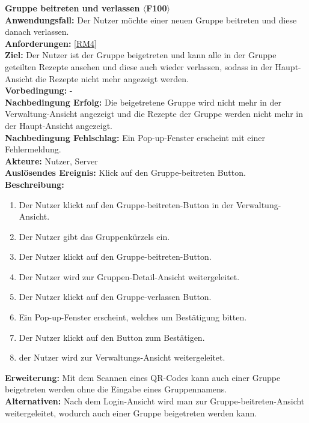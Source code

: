 \documentclass[parskip=full]{scrartcl}
\begin{document}
\textbf{Gruppe beitreten und verlassen $\langle$F100$\rangle$}\\
\textbf{Anwendungsfall:} Der Nutzer möchte einer neuen Gruppe beitreten und diese danach verlassen.\\
\textbf{Anforderungen:} \ref{RM4} \\
\textbf{Ziel:} Der Nutzer ist der Gruppe beigetreten und kann alle in der Gruppe geteilten Rezepte ansehen und diese auch wieder verlassen, sodass in der Haupt-Ansicht die Rezepte nicht mehr angezeigt werden.\\
\textbf{Vorbedingung:} -\\
\textbf{Nachbedingung Erfolg:} Die beigetretene Gruppe wird nicht mehr in der Verwaltung-Ansicht angezeigt und die Rezepte der Gruppe werden nicht mehr in der Haupt-Ansicht angezeigt.\\
\textbf{Nachbedingung Fehlschlag:} Ein Pop-up-Fenster erscheint mit einer Fehlermeldung.\\
\textbf{Akteure:} Nutzer, Server\\
\textbf{Auslösendes Ereignis:} Klick auf den Gruppe-beitreten Button.\\
\textbf{Beschreibung:}\\
\begin{enumerate}
    \item Der Nutzer klickt auf den Gruppe-beitreten-Button in der Verwaltung-Ansicht.
    \item Der Nutzer gibt das Gruppenkürzels ein.
    \item Der Nutzer klickt auf den Gruppe-beitreten-Button.
    \item Der Nutzer wird zur Gruppen-Detail-Ansicht weitergeleitet.
    \item Der Nutzer klickt auf den Gruppe-verlassen Button.
    \item Ein Pop-up-Fenster erscheint, welches um Bestätigung bitten.
    \item Der Nutzer klickt auf den Button zum Bestätigen.
    \item der Nutzer wird zur Verwaltungs-Ansicht weitergeleitet.
\end{enumerate}
\textbf{Erweiterung:} Mit dem Scannen eines QR-Codes kann auch einer Gruppe beigetreten werden ohne die Eingabe eines Gruppennamens.\\
\textbf{Alternativen:} Nach dem Login-Ansicht wird man zur Gruppe-beitreten-Ansicht weitergeleitet, wodurch auch einer Gruppe beigetreten werden kann.
\newpage
\end{document}

